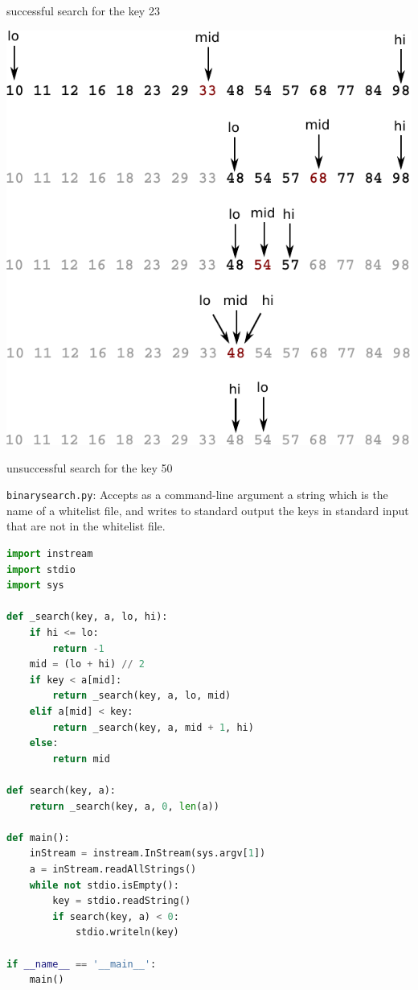 \documentclass[8pt,a4paper,compress,handout]{beamer}
\begin{document}
\begin{frame}[fragile]
\begin{minipage}{150pt}
\begin{center}
\tiny successful search for the key 23
\end{center}
\end{minipage}
\begin{minipage}{150pt}%
\hfill
\begin{center}
\includegraphics[scale=0.4]{./figures/bs2.pdf}

\smallskip

\tiny unsuccessful search for the key 50
\end{center}
\end{minipage}
\end{frame}

\begin{frame}[fragile]
\begin{framed}
\tiny \lstinline{binarysearch.py}: Accepts as a command-line argument a string which is the name of a whitelist file, and writes to standard output the keys in standard input that are not in the whitelist file.
\end{framed}

\begin{lstlisting}[language=Python]
import instream
import stdio
import sys

def _search(key, a, lo, hi):
    if hi <= lo:
        return -1
    mid = (lo + hi) // 2
    if key < a[mid]:
        return _search(key, a, lo, mid)
    elif a[mid] < key:
        return _search(key, a, mid + 1, hi)
    else:
        return mid

def search(key, a):
    return _search(key, a, 0, len(a))

def main():
    inStream = instream.InStream(sys.argv[1])
    a = inStream.readAllStrings()
    while not stdio.isEmpty():
        key = stdio.readString()
        if search(key, a) < 0:
            stdio.writeln(key)

if __name__ == '__main__':
    main()
\end{lstlisting}
\end{frame}
\end{document}
